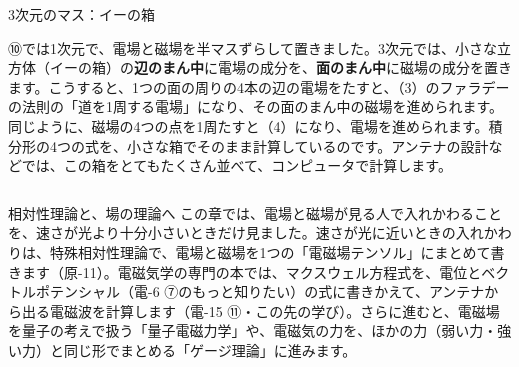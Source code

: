 \begin{column}{3次元のマス：イーの箱}
\noindent\begin{minipage}[c]{0.56\linewidth}\raggedright
⑩では1次元で、電場と磁場を半マスずらして置きました。3次元では、小さな立方体（イーの箱）の\textbf{辺のまん中}に電場の成分を、\textbf{面のまん中}に磁場の成分を置きます。こうすると、1つの面の周りの4本の辺の電場をたすと、（3）のファラデーの法則の「道を1周する電場」になり、その面のまん中の磁場を進められます。同じように、磁場の4つの点を1周たすと（4）になり、電場を進められます。積分形の4つの式を、小さな箱でそのまま計算しているのです。アンテナの設計などでは、この箱をとてもたくさん並べて、コンピュータで計算します。
\end{minipage}\hfill
\begin{minipage}[c]{0.4\linewidth}\centering
{}
\end{minipage}
\end{column}

\begin{phsaki}{相対性理論と、場の理論へ}
この章では、電場と磁場が見る人で入れかわることを、速さが光より十分小さいときだけ見ました。速さが光に近いときの入れかわりは、特殊相対性理論で、電場と磁場を1つの「電磁場テンソル」にまとめて書きます（原-11）。電磁気学の専門の本では、マクスウェル方程式を、電位とベクトルポテンシャル（電-6 ⑦のもっと知りたい）の式に書きかえて、アンテナから出る電磁波を計算します（電-15 ⑪・この先の学び）。さらに進むと、電磁場を量子の考えで扱う「量子電磁力学」や、電磁気の力を、ほかの力（弱い力・強い力）と同じ形でまとめる「ゲージ理論」に進みます。
\end{phsaki}

